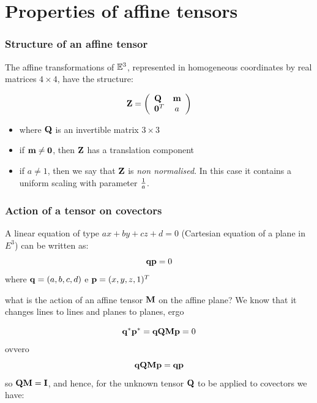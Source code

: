 \documentclass{beamer}
\begin{document}
\section{Properties of affine tensors}
\begin{frame}\frametitle{Structure of an affine tensor}

\vfill

The affine transformations of ${\mathbb{E}}^3$, represented in homogeneous coordinates by real matrices $4\times 4$, have the structure:

\[
{\bf Z} = {\left(\begin{array}{cccccccccccccccccccccccccccc}
{\bf Q}~ & {\bf m} \\
{\bf 0}^T &  a
\end{array}\right)}
\]

\vfill

\begin{itemize}
\item 
where ${\bf Q}$ is an invertible matrix $3\times 3$

\item \vspace{-2mm}
if ${\bf m} \not=
{\bf 0}$, then ${\bf Z}$ has a translation component 

\item \vspace{-2mm}
if $a \not=1$, then we say that ${\bf Z}$ is \emph{non normalised}.  In this case it contains a uniform scaling  with parameter $1\over a$.
\end{itemize}

\vfill

\end{frame}
\begin{frame}\frametitle{Action of a tensor on covectors}

\vfill

A linear equation of type $ax + by +cz +d = 0$ (Cartesian equation of a plane in $E^3$) can be written as: 
\[
{\bf q} {\bf p} = 0
\]
where ${\bf q}=(a,b,c,d)$ e ${\bf p}=(x,y,z,1)^T$

\vfill
what is the \alert{action of an affine tensor} ${\bf M}$ on the affine plane?
We know that it changes lines to lines and planes to planes, ergo

\[
{\bf q}^*  {\bf p}^* = {\bf q}{\bf Q}  {\bf M}{\bf p} = 0
\]
ovvero
\[
{\bf q}{\bf Q}  {\bf M}{\bf p} = {\bf q}  {\bf p}
\]
so ${\bf Q} {\bf M} = {\bf I}$, and hence, for the unknown tensor ${\bf Q}$  to be applied to covectors we have: 


\vfill

\end{frame}
\end{document}
